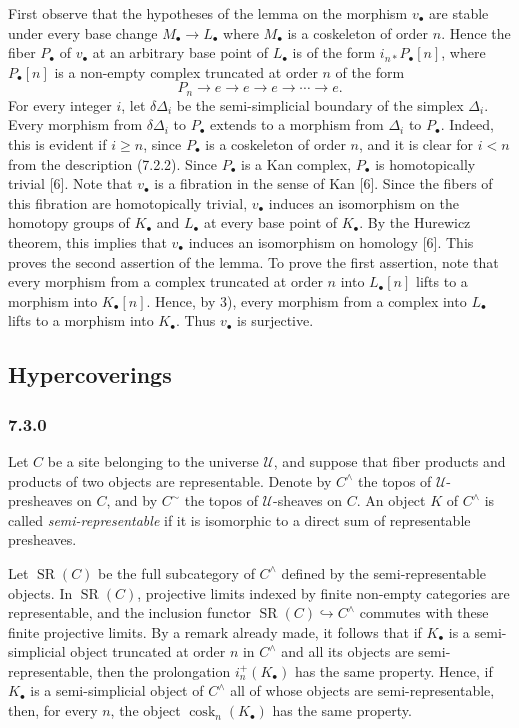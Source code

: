 \documentclass[11pt]{article}
\newcommand{\U}{\mathcal{U}}
\newcommand{\cosk}{\operatorname{cosk}}
\newcommand{\SR}{\operatorname{SR}}
\begin{document}
First observe that the hypotheses of the lemma on the morphism $v_\bullet$ are stable under every base change $M_\bullet\to L_\bullet$ where $M_\bullet$ is a coskeleton of order $n$. Hence the fiber $P_\bullet$ of $v_\bullet$ at an arbitrary base point of $L_\bullet$ is of the form $i_{n*}P_\bullet[n]$, where $P_\bullet[n]$ is a non-empty complex truncated at order $n$ of the form
\begin{equation*}
        P_n\to e\to e\to e\to\cdots\to e.\tag{7.2.2}
\end{equation*}
For every integer $i$, let $\delta\Delta_i$ be the semi-simplicial boundary of the simplex $\Delta_i$. Every morphism from $\delta\Delta_i$ to $P_\bullet$ extends to a morphism from $\Delta_i$ to $P_\bullet$. Indeed, this is evident if $i\geq n$, since $P_\bullet$ is a coskeleton of order $n$, and it is clear for $i<n$ from the description (7.2.2). Since $P_\bullet$ is a Kan complex, $P_\bullet$ is homotopically trivial [6]. Note that $v_\bullet$ is a fibration in the sense of Kan [6]. Since the fibers of this fibration are homotopically trivial, $v_\bullet$ induces an isomorphism on the homotopy groups of $K_\bullet$ and $L_\bullet$ at every base point of $K_\bullet$. By the Hurewicz theorem, this implies that $v_\bullet$ induces an isomorphism on homology [6]. This proves the second assertion of the lemma. To prove the first assertion, note that every morphism from a complex truncated at order $n$ into $L_\bullet[n]$ lifts to a morphism into $K_\bullet[n]$. Hence, by 3), every morphism from a complex into $L_\bullet$ lifts to a morphism into $K_\bullet$. Thus $v_\bullet$ is surjective.

\subsection{Hypercoverings}

\subsubsection*{7.3.0}
Let $C$ be a site belonging to the universe $\U$, and suppose that fiber products and products of two objects are representable. Denote by $C^{\wedge}$ the topos of $\U$-presheaves on $C$, and by $C^{\sim}$ the topos of $\U$-sheaves on $C$. An object $K$ of $C^{\wedge}$ is called \emph{semi-representable} if it is isomorphic to a direct sum of representable presheaves.

Let $\SR(C)$ be the full subcategory of $C^{\wedge}$ defined by the semi-representable objects. In $\SR(C)$, projective limits indexed by finite non-empty categories are representable, and the inclusion functor $\SR(C)\hookrightarrow C^{\wedge}$ commutes with these finite projective limits. By a remark already made, it follows that if $K_\bullet$ is a semi-simplicial object truncated at order $n$ in $C^{\wedge}$ and all its objects are semi-representable, then the prolongation $i_n^+(K_\bullet)$ has the same property. Hence, if $K_\bullet$ is a semi-simplicial object of $C^{\wedge}$ all of whose objects are semi-representable, then, for every $n$, the object $\cosk_n(K_\bullet)$ has the same property.
\end{document}
